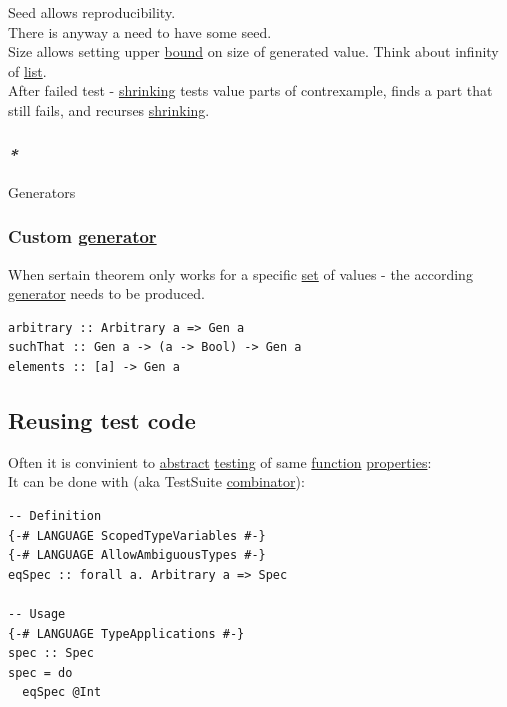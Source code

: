 \documentclass[a4paper,14pt,oneside]{book}
\begin{document}
Seed allows reproducibility.\\
There is anyway a need to have some seed.\\
Size allows setting upper \hyperref[org4508e79]{bound} on size of generated value. Think about infinity of \hyperref[orga11ac6c]{list}.\\

After failed test - \hyperref[org5b8f43e]{shrinking} tests value parts of contrexample, finds a part that still fails, and recurses \hyperref[org5b8f43e]{shrinking}.\\

\subsubsection{\emph{*}}
\label{sec:orgaafe5ae}

\label{orgd3a3032}Generators\\

\subsubsection{Custom \hyperref[org8c8d3b6]{generator}}
\label{sec:orga29eb6b}
When sertain theorem only works for a specific \hyperref[orge119629]{set} of values - the according \hyperref[org8c8d3b6]{generator} needs to be produced.\\

\begin{verbatim}
arbitrary :: Arbitrary a => Gen a
suchThat :: Gen a -> (a -> Bool) -> Gen a
elements :: [a] -> Gen a
\end{verbatim}

\subsection{\label{org6156516}Reusing test code}
\label{sec:orgc6e2cee}
Often it is convinient to \hyperref[org321fc4b]{abstract} \hyperref[orgb234d91]{testing} of same \hyperref[org8cc2ae4]{function} \hyperref[org1feb373]{properties}:\\

It can be done with (aka TestSuite \hyperref[org2e7fef3]{combinator}):\\
\begin{verbatim}
-- Definition
{-# LANGUAGE ScopedTypeVariables #-}
{-# LANGUAGE AllowAmbiguousTypes #-}
eqSpec :: forall a. Arbitrary a => Spec

-- Usage
{-# LANGUAGE TypeApplications #-}
spec :: Spec
spec = do
  eqSpec @Int
\end{verbatim}
\end{document}
